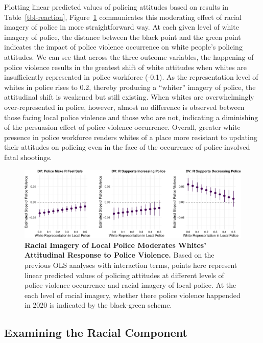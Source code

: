 \documentclass[
  12pt,
]{article}
\begin{document}
Plotting linear predicted values of policing attitudes based on results
in Table~\ref{tbl-reaction}, Figure~\ref{fig-reaction-mod} communicates
this moderating effect of racial imagery of police in more
straightforward way. At each given level of white imagery of police, the
distance between the black point and the green point indicates the
impact of police violence occurrence on white people's policing
attitudes. We can see that across the three outcome variables, the
happening of police violence results in the greatest shift of white
attitudes when whites are insufficiently represented in police workforce
(-0.1). As the representation level of whites in police rises to 0.2,
thereby producing a ``whiter'' imagery of police, the attitudinal shift
is weakened but still existing. When whites are overwhelmingly
over-represented in police, however, almost no difference is observed
between those facing local police violence and those who are not,
indicating a diminishing of the persuasion effect of police violence
occurrence. Overall, greater white presence in police workforce renders
whites of a place more resistant to updating their attitudes on policing
even in the face of the occurrence of police-involved fatal shootings.

\begin{figure}[tb]

{\centering \includegraphics{racialized-police_files/figure-pdf/fig-reaction-mod-1.pdf}

}

\caption{\label{fig-reaction-mod}\textbf{Racial Imagery of Local Police
Moderates Whites' Attitudinal Response to Police Violence.} Based on the
previous OLS analyses with interaction terms, points here represent
linear predicted values of policing attitudes at different levels of
police violence occurrence and racial imagery of local police. At the
each level of racial imagery, whether there police violence happended in
2020 is indicated by the black-green scheme.}

\end{figure}

\hypertarget{examining-the-racial-component}{%
\subsection{Examining the Racial
Component}\label{examining-the-racial-component}}
\end{document}
